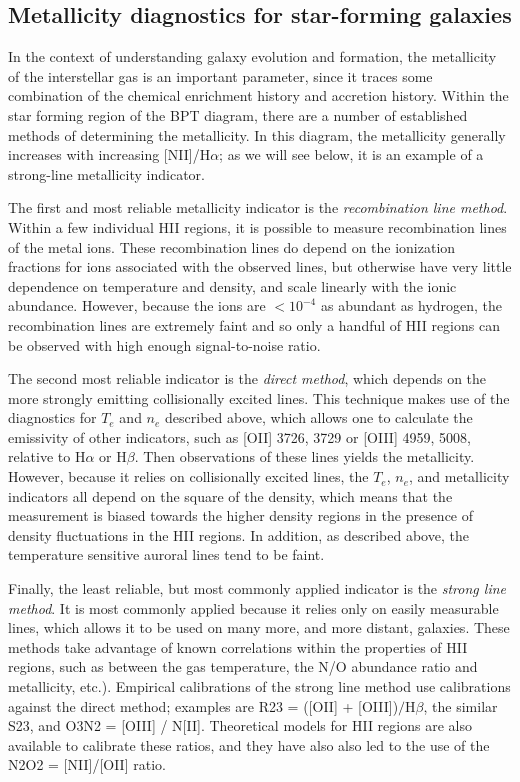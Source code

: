 \subsection{Metallicity diagnostics for star-forming galaxies}

In the context of understanding galaxy evolution and formation, the
metallicity of the interstellar gas is an important parameter, since
it traces some combination of the chemical enrichment history and
accretion history.  Within the star forming region of the BPT diagram,
there are a number of established methods of determining the
metallicity. In this diagram, the metallicity generally increases with
increasing [NII]/H$\alpha$; as we will see below, it is an example of
a strong-line metallicity indicator.

The first and most reliable metallicity indicator is the {\it
recombination line method}. Within a few individual HII regions, it is
possible to measure recombination lines of the metal ions. These
recombination lines do depend on the ionization fractions for ions
associated with the observed lines, but otherwise have very little
dependence on temperature and density, and scale linearly with the
ionic abundance. However, because the ions are $<10^{-4}$ as abundant
as hydrogen, the recombination lines are extremely faint and so only a
handful of HII regions can be observed with high enough
signal-to-noise ratio.

The second most reliable indicator is the {\it direct method}, which
depends on the more strongly emitting collisionally excited
lines. This technique makes use of the diagnostics for $T_e$ and $n_e$
described above, which allows one to calculate the emissivity of other
indicators, such as [OII] 3726, 3729 or [OIII] 4959, 5008, relative to
H$\alpha$ or H$\beta$. Then observations of these lines yields the
metallicity. However, because it relies on collisionally excited
lines, the $T_e$, $n_e$, and metallicity indicators all depend on the
square of the density, which means that the measurement is biased
towards the higher density regions in the presence of density
fluctuations in the HII regions. In addition, as described above, the
temperature sensitive auroral lines tend to be faint.

Finally, the least reliable, but most commonly applied indicator is
the {\it strong line method}. It is most commonly applied because it
relies only on easily measurable lines, which allows it to be used on
many more, and more distant, galaxies. These methods take advantage of
known correlations within the properties of HII regions, such as
between the gas temperature, the N/O abundance ratio and metallicity,
etc.). Empirical calibrations of the strong line method use
calibrations against the direct method; examples are R23 = ([OII] +
[OIII])$/$H$\beta$, the similar S23, and O3N2 = [OIII] / N[II].
Theoretical models for HII regions are also available to calibrate
these ratios, and they have also also led to the use of the N2O2 =
[NII]/[OII] ratio.

